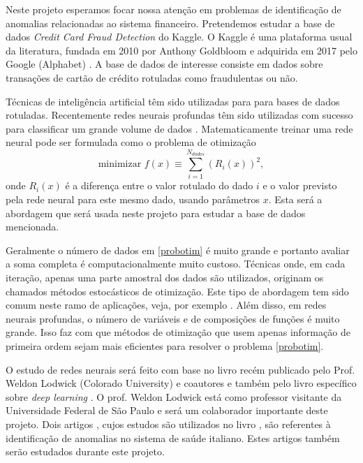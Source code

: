 \documentclass[a4paper,12pt]{article}
\begin{document}
Neste projeto esperamos focar nossa atenção em problemas de identificação de anomalias relacionadas ao sistema financeiro. Pretendemos estudar a  base de dados \textit{Credit Card Fraud Detection} do  Kaggle.  O Kaggle é uma plataforma usual da literatura, fundada em 2010 por  Anthony Goldbloom e adquirida em 2017 pelo Google (Alphabet) \cite{blogThiago}. A base de dados de interesse consiste em dados sobre transações de cartão de crédito rotuladas como fraudulentas ou não.

Técnicas de inteligência artificial têm sido utilizadas para para bases de dados rotuladas. Recentemente redes neurais profundas têm sido utilizadas com sucesso para classificar um grande volume de dados \cite{livroGoodfellow}. Matematicamente treinar uma rede neural pode ser formulada como o problema de otimização
\begin{equation}\label{probotim}
\text{minimizar } f(x) \equiv \sum_{i=1}^{N_{dados}} \left(R_i(x) \right)^2,
\end{equation}
onde $R_i(x)$ é a diferença entre o valor rotulado do dado $i$ e o valor previsto pela rede neural para este mesmo dado, usando parâmetros $x$. Esta será a abordagem que será usada neste projeto para estudar a base de dados mencionada. 

Geralmente o número de dados em \eqref{probotim} é muito grande e portanto avaliar a soma completa é computacionalmente muito custoso. Técnicas onde, em cada iteração, apenas uma parte amostral dos dados são utilizados, originam os chamados métodos estocásticos de otimização.  Este tipo de abordagem tem sido comum neste ramo de aplicações, veja, por exemplo \cite{livroGoodfellow}. Além disso, em redes neurais profundas, o número de variáveis e de composições de funções é muito grande. Isso faz com que métodos de otimização que usem apenas informação de primeira ordem sejam mais eficientes para resolver o problema \eqref{probotim}.

O estudo de redes neurais será feito com base no livro recém publicado pelo Prof. Weldon Lodwick (Colorado University) e coautores \cite{livroWeldon} e também pelo livro específico sobre \textit{deep learning} \cite{livroGoodfellow}. O prof. Weldon Lodwick está como professor visitante da Universidade Federal de São Paulo e será um colaborador importante deste projeto. Dois artigos \cite{fraudeItalia1,fraudeItalia2}, cujos estudos são utilizados no livro \cite{livroWeldon}, são referentes à identificação de anomalias no sistema de saúde italiano. Estes artigos também serão estudados durante este projeto. 
\end{document}
